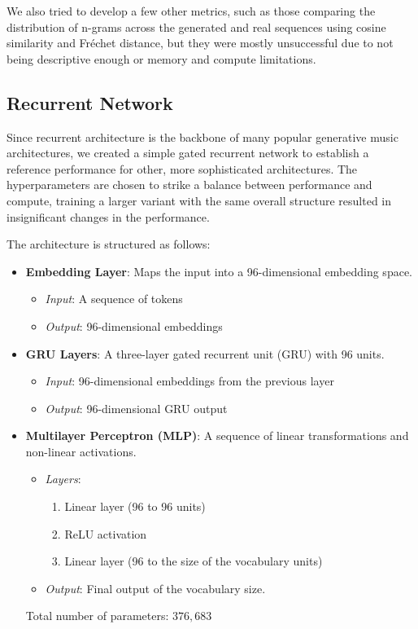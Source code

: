 \documentclass{article}
\begin{document}
We also tried to develop a few other metrics, such as those comparing the distribution of n-grams across the generated and real sequences using cosine similarity and Fr\'echet distance, but they were mostly unsuccessful due to not being descriptive enough or memory and compute limitations.

\subsection{Recurrent Network}

Since recurrent architecture is the backbone of many popular generative music architectures, we created a simple gated recurrent network to establish a reference performance for other, more sophisticated architectures. The hyperparameters are chosen to strike a balance between performance and compute, training a larger variant with the same overall structure resulted in insignificant changes in the performance.

The architecture is structured as follows:

\begin{itemize}
    \item \textbf{Embedding Layer}: Maps the input into a 96-dimensional embedding space. 
    \begin{itemize}
        \item \textit{Input}: A sequence of tokens
        \item \textit{Output}: 96-dimensional embeddings
    \end{itemize}
    
    \item \textbf{GRU Layers}: A three-layer gated recurrent unit (GRU) with 96 units.
    \begin{itemize}
        \item \textit{Input}: 96-dimensional embeddings from the previous layer
        \item \textit{Output}: 96-dimensional GRU output
    \end{itemize}

    \item \textbf{Multilayer Perceptron (MLP)}: A sequence of linear transformations and non-linear activations.
    \begin{itemize}
        \item \textit{Layers}: 
        \begin{enumerate}
            \item Linear layer (96 to 96 units)
            \item ReLU activation
            \item Linear layer (96 to the size of the vocabulary units)
        \end{enumerate}
        \item \textit{Output}: Final output of the vocabulary size.
    \end{itemize}

    Total number of parameters: $376,683$
\end{itemize}
\end{document}
